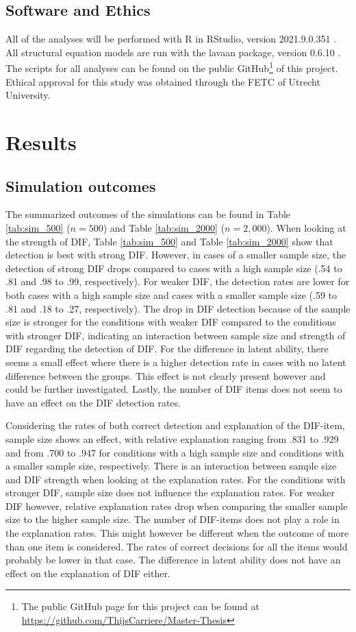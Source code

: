\documentclass{interact}
\begin{document}
\subsection{Software and Ethics}
All of the analyses will be performed with R \parencite{Rsoftware} in RStudio, version 2021.9.0.351 \parencite{Rstudio}. All structural equation models are run with the lavaan package, version 0.6.10 \parencite{rosseel2012lavaan}. The scripts for all analyses can be found on the public GitHub\footnote[2]{The public GitHub page for this project can be found at \url{https://github.com/ThijsCarriere/Master-Thesis}} of this project. Ethical approval for this study was obtained through the FETC of Utrecht University. 

\section{Results}
\label{sec: 4 results}
\subsection{Simulation outcomes}
The summarized outcomes of the simulations can be found in Table \ref{tab:sim_500} ($n = 500$) and Table \ref{tab:sim_2000} ($n = 2,000$). When looking at the strength of DIF, Table \ref{tab:sim_500} and Table \ref{tab:sim_2000} show that detection is best with strong DIF. However, in cases of a smaller sample size, the detection of strong DIF drops compared to cases with a high sample size (.54 to .81 and .98 to .99, respectively). For weaker DIF, the detection rates are lower for both cases with a high sample size and cases with a smaller sample size (.59 to .81 and .18 to .27, respectively). The drop in DIF detection because of the sample size is stronger for the conditions with weaker DIF compared to the conditions with stronger DIF, indicating an interaction between sample size and strength of DIF regarding the detection of DIF. For the difference in latent ability, there seems a small effect where there is a higher detection rate in cases with no latent difference between the groups. This effect is not clearly present however and could be further investigated. Lastly, the number of DIF items does not seem to have an effect on the DIF detection rates.

Considering the rates of both correct detection and explanation of the DIF-item, sample size shows an effect, with relative explanation ranging from .831 to .929 and from .700 to .947 for conditions with a high sample size and conditions with a smaller sample size, respectively. There is an interaction between sample size and DIF strength when looking at the explanation rates. For the conditions with stronger DIF, sample size does not influence the explanation rates. For weaker DIF however, relative explanation rates drop when comparing the smaller sample size to the higher sample size. The number of DIF-items does not play a role in the explanation rates. This might however be different when the outcome of more than one item is considered. The rates of correct decisions for all the items would probably be lower in that case. The difference in latent ability does not have an effect on the explanation of DIF either. 
\end{document}
